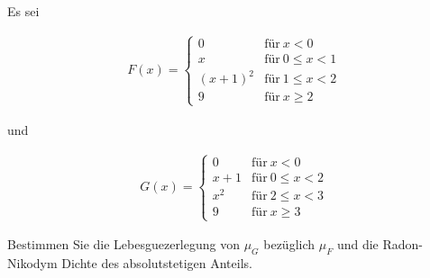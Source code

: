
\begin{exercise}

Es sei

\begin{align*}
    F(x)
    =
    \begin{cases}
        0         & \text{für}~ x < 0 \\
        x         & \text{für}~ 0 \leq x < 1 \\
        (x + 1)^2 & \text{für}~ 1 \leq x < 2 \\
        9         & \text{für}~ x \geq 2
    \end{cases}
\end{align*}

und

\begin{align*}
    G(x)
    =
    \begin{cases}
        0     & \text{für}~ x < 0 \\
        x + 1 & \text{für}~ 0 \leq x < 2 \\
        x^2   & \text{für}~ 2 \leq x < 3 \\
        9     & \text{für}~ x \geq 3
    \end{cases}
\end{align*}

Bestimmen Sie die Lebesguezerlegung von $\mu_G$ bezüglich $\mu_F$ und die Radon-Nikodym Dichte des absolutstetigen Anteils.

\end{exercise}


